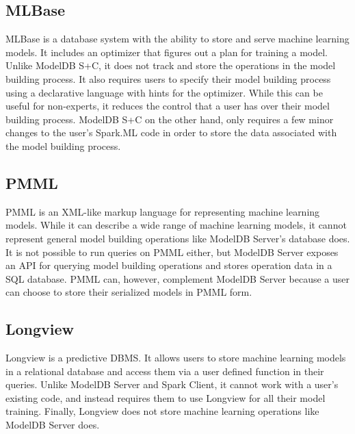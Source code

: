 \subsection{MLBase}
MLBase \cite{mlbase} is a database system with the ability to store and serve machine learning
models. It includes an optimizer that figures out a plan for training a model. Unlike ModelDB S+C,
it does not track and store the operations in the model building process. It also requires users to
specify their model building process using a declarative language with hints for the optimizer. While this
can be useful for non-experts, it reduces the control that a user has over their model building process.
ModelDB S+C on the other hand, only requires a few minor changes to the user's Spark.ML code in order to
store the data associated with the model building process.

\subsection{PMML}
PMML \cite{pmml} is an XML-like markup language for representing machine learning models. While it
can describe a wide range of machine learning models, it cannot represent general model building operations
like ModelDB Server's database does. It is not possible to run queries on PMML either, but ModelDB Server
exposes an API for querying model building operations and stores operation data in a SQL database. PMML can,
however, complement ModelDB Server because a user can choose to store their serialized models in PMML form.

\subsection{Longview}
Longview is a predictive DBMS. It allows users to store machine learning models in a relational database
and access them via a user defined function in their queries. Unlike ModelDB Server and Spark Client, it
cannot work with a user's existing code, and instead requires them to use Longview for all their
model training. Finally, Longview does not store machine learning operations like ModelDB Server does.
